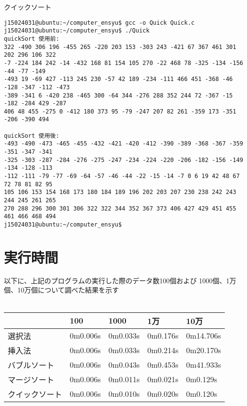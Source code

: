 \documentclass[a4j,titlepage]{jarticle}
\begin{document}
\begin{breakitembox}[l]{クイックソート} \small
\begin{verbatim}
j15024031@ubuntu:~/computer_ensyu$ gcc -o Quick Quick.c
j15024031@ubuntu:~/computer_ensyu$ ./Quick
quickSort 使用前:
322 -490 306 196 -455 265 -220 203 153 -303 243 -421 67 367 461 301 202 296 106 322 
-7 -224 184 242 -14 -432 168 81 154 105 270 -22 468 78 -325 -134 -156 -44 -77 -149 
-493 19 -69 427 -113 245 230 -57 42 189 -234 -111 466 451 -368 -46 -128 -347 -112 -473
-389 -341 6 -420 238 -465 300 -64 344 -276 288 352 244 72 -367 -15 -182 -284 429 -287 
406 48 455 -275 0 -412 180 373 95 -79 -247 207 82 261 -359 173 -351 -206 -390 494 

quickSort 使用後:
-493 -490 -473 -465 -455 -432 -421 -420 -412 -390 -389 -368 -367 -359 -351 -347 -341 
-325 -303 -287 -284 -276 -275 -247 -234 -224 -220 -206 -182 -156 -149 -134 -128 -113 
-112 -111 -79 -77 -69 -64 -57 -46 -44 -22 -15 -14 -7 0 6 19 42 48 67 72 78 81 82 95 
105 106 153 154 168 173 180 184 189 196 202 203 207 230 238 242 243 244 245 261 265 
270 288 296 300 301 306 322 322 344 352 367 373 406 427 429 451 455 461 466 468 494 
j15024031@ubuntu:~/computer_ensyu$ 
\end{verbatim}
\end{breakitembox}




\section{実行時間}
以下に、上記のプログラムの実行した際のデータ数100個および 1000個、1万個、10万個について調べた結果を示す
\\
\\
\begin{tabular}{|l|l|l|l|l|}
\hline
 & 100 & 1000 & 1万 & 10万 \\
\hline
選択法 & 0m0.006s & 0m0.033s & 0m0.176s & 0m14.706s \\
挿入法 & 0m0.006s & 0m0.033s & 0m0.214s & 0m20.170s \\
バブルソート & 0m0.006s & 0m0.043s & 0m0.453s & 0m41.933s
 \\
マージソート & 0m0.006s & 0m0.011s & 0m0.021s & 0m0.129s \\
クイックソート & 0m0.006s & 0m0.010s & 0m0.020s & 0m0.120s \\
\hline
\end{tabular}
\end{document}

